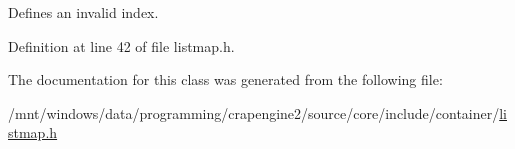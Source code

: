 Defines an invalid index. 



Definition at line 42 of file listmap.\+h.



The documentation for this class was generated from the following file\+:\begin{DoxyCompactItemize}
\item 
/mnt/windows/data/programming/crapengine2/source/core/include/container/\hyperlink{listmap_8h}{listmap.\+h}\end{DoxyCompactItemize}

